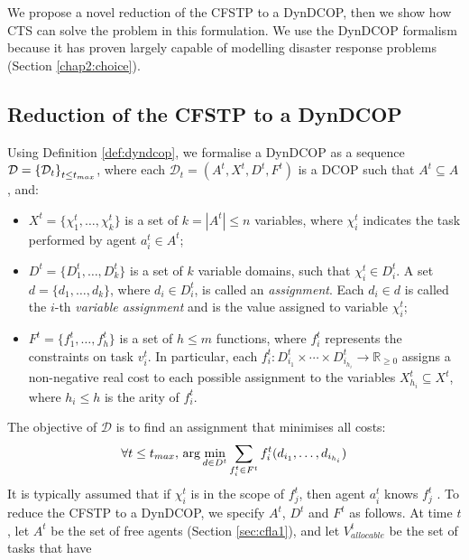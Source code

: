 We propose a novel reduction of the CFSTP to a DynDCOP, then we show how CTS can solve the
problem in this formulation. We use the DynDCOP formalism because it has proven largely
capable of modelling disaster response problems (Section \ref{chap2:choice}).

\subsection{Reduction of the CFSTP to a DynDCOP}\label{sec:reduction}

Using Definition \ref{def:dyndcop}, we formalise a DynDCOP as a sequence $\mathcal{D} =
\left\{ \mathcal{D}_t \right\}_{t \leq t_{max}}$, where each $\mathcal{D}_t = (A^t, X^t,
D^t, F^t)$ is a DCOP such that $A^t \subseteq A$, and:
\begin{itemize}
    \item $X^t = \{\chi_1^t, \dots, \chi_k^t\}$ is a set of $k = |A^t| \leq n$ variables,
        where $\chi_i^t$ indicates the task performed by agent $a_i^t \in A^t$;
    \item $D^t = \{D_1^t, \dots, D_k^t\}$ is a set of $k$ variable domains, such that
        $\chi_i^t \in D_i^t$. A set $d = \{d_1, \dots, d_k\}$, where $d_i \in D_i^t$, is
        called an \emph{assignment}. Each $d_i \in d$ is called the $i$-th \emph{variable
        assignment} and is the value assigned to variable $\chi_i^t$;
    \item $F^t = \{f_1^t, \dots, f_h^t\}$ is a set of $h \leq m$ functions, where $f_i^t$
        represents the constraints on task $v_i^t$. In particular, each $f_i^t : D_{i_1}^t
        \times \cdots \times D_{i_{h_i}}^t \to \mathbb{R}_{\geq 0}$ assigns a non-negative
        real cost to each possible assignment to the variables $X_{h_i}^t \subseteq X^t$,
        where $h_i \leq h$ is the arity of $f_i^t$.
\end{itemize}
The objective of $\mathcal{D}$ is to find an assignment that minimises all costs:
\begin{equation}\label{eq:dcop}
    \forall t \leq t_{max},\, \arg \min_{d \in D^t}
    \sum_{f_i^t \in F^t} f_i^t(d_{i_1}, \dots, d_{i_{h_i}})
\end{equation}
It is typically assumed that if $\chi_i^t$ is in the scope of $f_j^t$, then agent $a_i^t$
knows $f_j^t$ \cite[Section $4.2$]{fioretto2018survey}. To reduce the CFSTP to a DynDCOP,
we specify $A^t$, $D^t$ and $F^t$ as follows. At time $t$, let $A^t$ be the set of free
agents (Section \ref{sec:cfla1}), and let $V^t_{allocable}$ be the set of tasks that have
